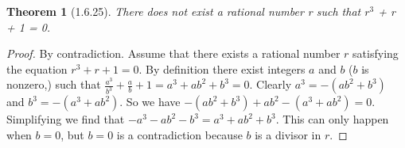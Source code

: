 \documentclass[a4paper, 12pt]{article}
\theoremstyle{plain}
\newtheorem*{theorem*}{Theorem}
\begin{document}
	
	\begin{theorem*}[1.6.25]
		There does not exist a rational number r such that \newline $r^{3}$ + r + 1 = 0.
	\end{theorem*}
	
	\begin{proof}
		By contradiction. Assume that there exists a rational number $r$ \newline satisfying the 
		equation $r^{3} + r + 1 = 0$. By definition there exist integers $a$ and $b$ 
		($b$ is nonzero,) such that 
		$\frac{a^{3}}{b^{3}} + \frac{a}{b} + 1 = a^{3} + ab^{2} + b^{3} = 0$. 
		Clearly $a^{3} = -(ab^{2} + b^{3})$ and $b^{3} = -(a^{3} + ab^{2})$. So we have 
		$-(ab^{2} + b^{3}) + ab^{2} - (a^{3} + ab^{2}) = 0$. Simplifying we find that 
		$-a^{3} -ab^{2} - b^{3} = a^{3} + ab^{2} + b^{3}$. This can only happen when $b = 0$, but 
		$b = 0$ is a contradiction because $b$ is a divisor in $r$.
	\end{proof}
\end{document}
